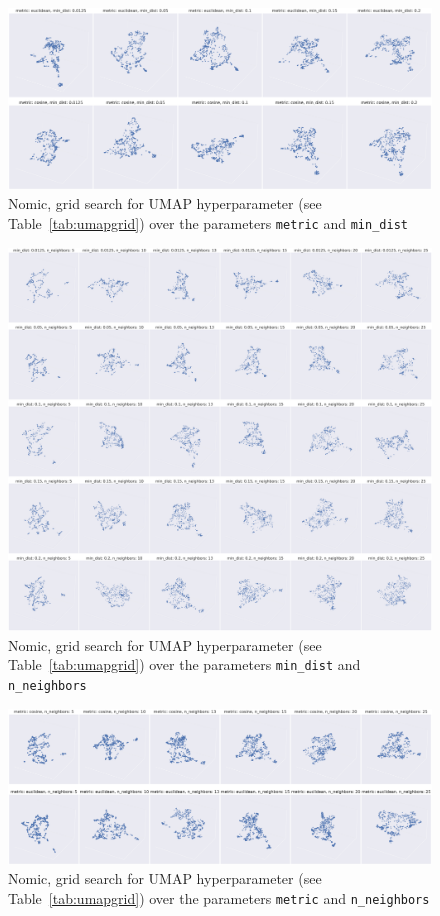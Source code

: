 \documentclass[10pt,oneside]{report}
\begin{document}
\begin{figure}[htbp]
    \centering
    \includegraphics[width=\textwidth]{./images/nomichyp1.png}
    \caption{Nomic, grid search for UMAP hyperparameter (see Table~\ref{tab:umapgrid}) over the parameters \texttt{metric} and \texttt{min\_dist}}
    \label{fig:nomic1}
\end{figure}%
\begin{figure}[htbp]
    \centering
    \includegraphics[width=\textwidth]{./images/nomichyp2.png}
    \caption{Nomic, grid search for UMAP hyperparameter (see Table~\ref{tab:umapgrid}) over the parameters \texttt{min\_dist} and \texttt{n\_neighbors}}
    \label{fig:nomic2}
\end{figure}%
\begin{figure}[htbp]
    \centering
    \includegraphics[width=\textwidth]{./images/nomichyp3.png}
    \caption{Nomic, grid search for UMAP hyperparameter (see Table~\ref{tab:umapgrid}) over the parameters \texttt{metric} and \texttt{n\_neighbors}}
    \label{fig:nomic3}
\end{figure}%
\end{document}
